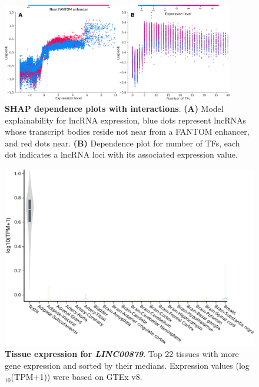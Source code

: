 \begin{figure}[!htb]
  \centering
  \includegraphics[width=0.9\textwidth]{plots/appendix/ml/shap.dep.interactions.png}
  \caption[SHAP dependence plots with interactions]{\textbf{SHAP dependence plots with interactions}. \textbf{(A)} Model explainability for lncRNA expression, blue dots represent lncRNAs whose transcript bodies reside not near from a FANTOM enhancer, and red dots near. \textbf{(B)} Dependence plot for number of TFs, each dot indicates a lncRNA loci with its associated expression value.}
  \label{supp-fig:shap-dep-interact}
\end{figure}

\begin{figure}[ht!]
  \centering
  \includegraphics[scale=0.55]{plots/appendix/ml/linc00789.gene.expression.pdf}
  \caption[Tissue expression for \textit{LINC00879}]{\textbf{Tissue expression for \textit{LINC00879}}. Top 22 tissues with more gene expression and sorted by their medians. Expression values (log$_{10}$(TPM+1)) were based on GTEx v8.}
  \label{supp-fig:linc-gene-expression}
\end{figure}

